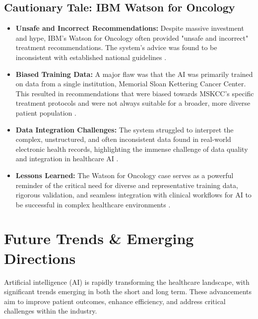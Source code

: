 \subsection{Cautionary Tale: IBM Watson for Oncology}
\begin{itemize}
    \item \textbf{Unsafe and Incorrect Recommendations:} Despite massive investment and hype, IBM's Watson for Oncology often provided "unsafe and incorrect" treatment recommendations. The system's advice was found to be inconsistent with established national guidelines \cite{Advisory_Watson}.
    \item \textbf{Biased Training Data:} A major flaw was that the AI was primarily trained on data from a single institution, Memorial Sloan Kettering Cancer Center. This resulted in recommendations that were biased towards MSKCC's specific treatment protocols and were not always suitable for a broader, more diverse patient population \cite{HealthcareDigital_Watson}.
    \item \textbf{Data Integration Challenges:} The system struggled to interpret the complex, unstructured, and often inconsistent data found in real-world electronic health records, highlighting the immense challenge of data quality and integration in healthcare AI \cite{HealtharkAI_Watson}.
    \item \textbf{Lessons Learned:} The Watson for Oncology case serves as a powerful reminder of the critical need for diverse and representative training data, rigorous validation, and seamless integration with clinical workflows for AI to be successful in complex healthcare environments \cite{HenricoDolfing_Watson}.
\end{itemize}

\section{Future Trends \& Emerging Directions}

Artificial intelligence (AI) is rapidly transforming the healthcare landscape, with significant trends emerging in both the short and long term. These advancements aim to improve patient outcomes, enhance efficiency, and address critical challenges within the industry.

